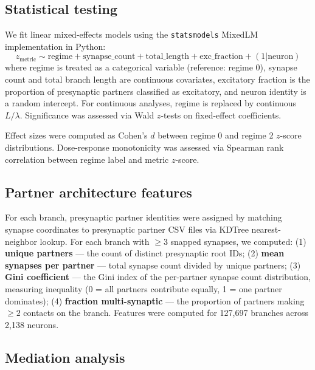 \documentclass[11pt]{article}
\begin{document}
\subsection{Statistical testing}

We fit linear mixed-effects models using the \texttt{statsmodels} MixedLM implementation in Python:
\[
z_{\text{metric}} \sim \text{regime} + \text{synapse\_count} + \text{total\_length} + \text{exc\_fraction} + (1 | \text{neuron})
\]
where regime is treated as a categorical variable (reference: regime 0), synapse count and total branch length are continuous covariates, excitatory fraction is the proportion of presynaptic partners classified as excitatory, and neuron identity is a random intercept. For continuous analyses, regime is replaced by continuous $L/\lambda$. Significance was assessed via Wald $z$-tests on fixed-effect coefficients.

Effect sizes were computed as Cohen's $d$ between regime 0 and regime 2 $z$-score distributions. Dose-response monotonicity was assessed via Spearman rank correlation between regime label and metric $z$-score.

\subsection{Partner architecture features}

For each branch, presynaptic partner identities were assigned by matching synapse coordinates to presynaptic partner CSV files via KDTree nearest-neighbor lookup. For each branch with $\geq 3$ snapped synapses, we computed: (1) \textbf{unique partners} --- the count of distinct presynaptic root IDs; (2) \textbf{mean synapses per partner} --- total synapse count divided by unique partners; (3) \textbf{Gini coefficient} --- the Gini index of the per-partner synapse count distribution, measuring inequality (0 = all partners contribute equally, 1 = one partner dominates); (4) \textbf{fraction multi-synaptic} --- the proportion of partners making $\geq 2$ contacts on the branch. Features were computed for 127,697 branches across 2,138 neurons.

\subsection{Mediation analysis}
\end{document}
